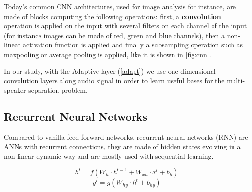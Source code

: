 \documentclass[master, tikz, final,11pt, dvipdfmx]{iscs-thesis}
\begin{document}
Today's common CNN architectures, used for image analysis for instance, are made of blocks computing the following operations: first, a \textbf{convolution} operation is applied on the input with several filters on each channel of the input (for instance images can be made of red, green and blue channels), then a non-linear activation function is applied and finally a subsampling operation such as maxpooling or average pooling is applied, like it is shown in \autoref{fig:cnn}.

In our study, with the Adaptive layer (\autoref{adapt}) we use one-dimensional convolution layers along audio signal in order to learn useful bases for the multi-speaker separation problem.

\subsection{Recurrent Neural Networks}

Compared to vanilla feed forward networks, recurrent neural networks (RNN) are ANNs with recurrent connections, they are made of hidden states evolving in a non-linear dynamic way and
are mostly used with sequential learning.

\[
h^{t} = f(W_h \cdot h^{t-1} + W_{xh} \cdot x^t + b_h)
\]
\[
y^t = g(W_{hy} \cdot h^t + b_{hy} )
\]
\end{document}
